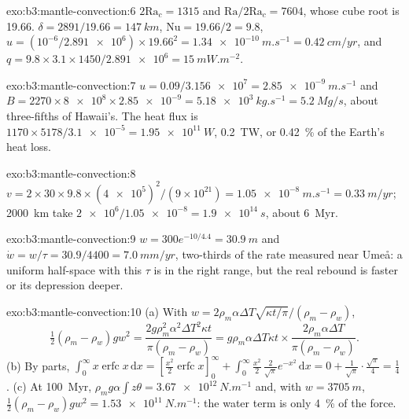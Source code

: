 \begin{solution}{exo:b3:mantle-convection:6}
$2\mathrm{Ra}_c = 1315$ and $\mathrm{Ra}/2\mathrm{Ra}_c = 7604$, whose cube
root is 19.66. $\delta = 2891/19.66 = \qty{147}{km}$, $\mathrm{Nu} = 19.66/2 =
9.8$, $u = (10^{-6}/\num{2.891e6})\times19.66^2 = \qty{1.34e-10}{m.s^{-1}} =
\qty{0.42}{cm/yr}$, and $q = 9.8\times3.1\times1450/\num{2.891e6} =
\qty{15}{mW.m^{-2}}$.
\end{solution}

\begin{solution}{exo:b3:mantle-convection:7}
$u = 0.09/\num{3.156e7} = \qty{2.85e-9}{m.s^{-1}}$ and $B = 2270\times\num{8e8}
\times\num{2.85e-9} = \qty{5.18e3}{kg.s^{-1}} = \qty{5.2}{Mg/s}$, about
three-fifths of Hawaii's. The heat flux is $1170\times5178/\num{3.1e-5} =
\qty{1.95e11}{W}$, \qty{0.2}{TW}, or \qty{0.42}{\percent} of the Earth's heat
loss.
\end{solution}

\begin{solution}{exo:b3:mantle-convection:8}
$v = 2\times30\times9.8\times(\num{4e5})^2/(9\times10^{21}) =
\qty{1.05e-8}{m.s^{-1}} = \qty{0.33}{m/yr}$; \qty{2000}{km} take
$\num{2e6}/\num{1.05e-8} = \qty{1.9e14}{s}$, about \qty{6}{Myr}.
\end{solution}

\begin{solution}{exo:b3:mantle-convection:9}
$w = 300e^{-10/4.4} = \qty{30.9}{m}$ and $\dot w = w/\tau = 30.9/4400 =
\qty{7.0}{mm/yr}$, two-thirds of the rate measured near Umeå: a uniform
half-space with this $\tau$ is in the right range, but the real rebound is
faster or its depression deeper.
\end{solution}

\begin{solution}{exo:b3:mantle-convection:10}
(a) With $w = 2\rho_m\alpha\Delta T\sqrt{\kappa t/\pi}/(\rho_m - \rho_w)$,
\[
  \tfrac12(\rho_m - \rho_w)gw^2 = \frac{2g\rho_m^2\alpha^2\Delta T^2\kappa t}
  {\pi(\rho_m - \rho_w)} = g\rho_m\alpha\Delta T\kappa t\times
  \frac{2\rho_m\alpha\Delta T}{\pi(\rho_m - \rho_w)} .
\] (b) By parts,
$\int_0^\infty x\operatorname{erfc}x\,\mathrm dx = [\tfrac{x^2}2\operatorname{erfc}
x]_0^\infty + \int_0^\infty\tfrac{x^2}2\,\tfrac2{\sqrt\pi}e^{-x^2}\,\mathrm dx =
0 + \tfrac1{\sqrt\pi}\cdot\tfrac{\sqrt\pi}4 = \tfrac14$. (c) At \qty{100}{Myr},
$\rho_mg\alpha\int z\theta = \qty{3.67e12}{N.m^{-1}}$ and, with $w =
\qty{3705}{m}$, $\tfrac12(\rho_m - \rho_w)gw^2 = \qty{1.53e11}{N.m^{-1}}$: the
water term is only \qty{4}{\percent} of the force.
\end{solution}

